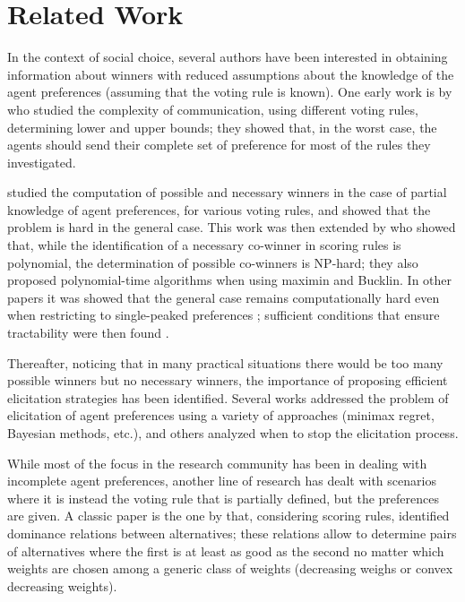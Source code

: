 \documentclass{article}
\begin{document}
\section{Related Work}
\label{sec:related}
In the context of social choice, several authors have been interested in obtaining information about winners with reduced assumptions about the knowledge of the agent preferences (assuming that the voting rule is known). One early work is  by  who studied the complexity of communication, using different voting rules, determining lower and upper bounds; they showed that, in the worst case, the agents should send their complete set of preference for most of the rules they investigated. 

 studied the computation of possible and necessary winners in the case of partial knowledge of agent preferences, for various voting rules, and showed that the problem is hard in the general case.
This work was then extended by \citet{Xia2008} who showed that, while the identification of a necessary co-winner in scoring rules is polynomial,  the determination of possible co-winners is NP-hard; they also  proposed polynomial-time algorithms when using maximin and Bucklin.
In other papers it was showed that the general case remains computationally hard even when restricting to single-peaked preferences \citep{Walsh2007};  sufficient conditions that ensure tractability were then found \citep{Pini2007}.


Thereafter, noticing that in many practical situations there would be too many possible winners but no necessary winners, the importance of proposing efficient elicitation strategies has been identified. 
Several works addressed the problem of  elicitation of agent preferences \citep{Naamani-Dery2015,Kalech2011,Lu2011,Pini2009,Benabbou2016,Dey2016,Dey2016_2} using a variety of approaches (minimax regret, Bayesian methods, etc.), and others \citep{Walsh2009,Conitzer2009}  analyzed when to stop the elicitation process.

While most of the focus in the research community has been in dealing with incomplete agent preferences, 
another line of research has dealt with scenarios where it is instead the voting rule that is partially defined, but the preferences are given. 
A classic paper is the one by \citet{Stein1994} that, considering scoring rules, identified dominance relations between alternatives; these relations allow to determine pairs of alternatives where the first is at least as good as the second no matter which weights are chosen among a generic class of weights (decreasing weighs or convex decreasing weights).
\end{document}
